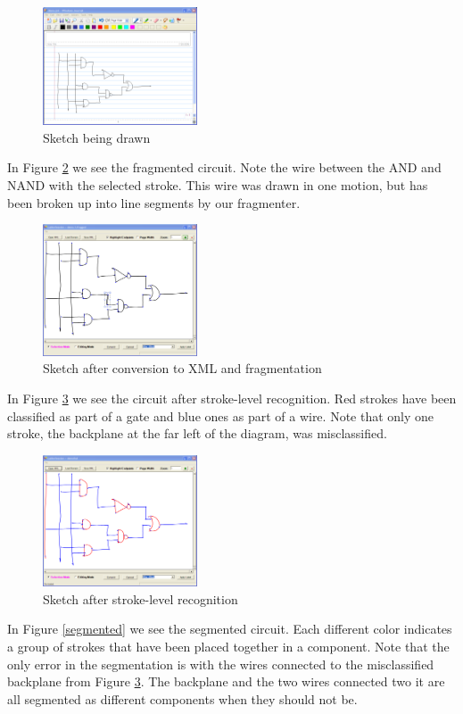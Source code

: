 \documentclass{acmsiggraph}               %
\begin{document}
\begin{figure}[p]
\centering
\includegraphics[width=1.8in]{sketchInJournal.png}
\caption{Sketch being drawn}
\label{journal}
\end{figure}

In Figure \ref{fragmented} we see the fragmented circuit.
Note the wire between the AND and NAND with the selected stroke.  
This wire was drawn in one motion, but has been broken up into line segments by our fragmenter.


\begin{figure}[p]
\centering
\includegraphics[width=1.8in]{fragmentedSketch.png}
\caption{Sketch after conversion to XML and fragmentation}
\label{fragmented}
\end{figure}

In Figure \ref{CRFed} we see the circuit after stroke-level recognition.  
Red strokes have been classified as part of a gate and blue ones as part of a wire.  
Note that only one stroke, the backplane at the far left of the diagram, was misclassified.

\begin{figure}[p]
\centering
\includegraphics[width=1.8in]{classifiedSketch.png}
\caption{Sketch after stroke-level recognition}
\label{CRFed}
\end{figure}

In Figure \ref{segmented} we see the segmented circuit.  
Each different color indicates a group of strokes that have been placed together in a component.  
Note that the only error in the segmentation is with the wires connected to the misclassified backplane from Figure \ref{CRFed}.  
The backplane and the two wires connected two it are all segmented as different components when they should not be.
\end{document}
